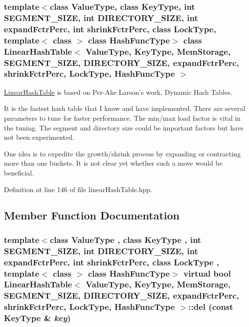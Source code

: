 \subsubsection*{template$<$class ValueType, class KeyType, int SEGMENT\_\-SIZE, int DIRECTORY\_\-SIZE, int expandFctrPerc, int shrinkFctrPerc, class LockType, template$<$ class $>$ class HashFuncType$>$ class LinearHashTable$<$ ValueType, KeyType, MemStorage, SEGMENT\_\-SIZE, DIRECTORY\_\-SIZE, expandFctrPerc, shrinkFctrPerc, LockType, HashFuncType $>$}

\hyperlink{classLinearHashTable}{LinearHashTable} is based on Per-Ake Larson's work, Dynamic Hash Tables. 

It is the fastest hash table that I know and have implemented. There are several parameters to tune for faster performance. The min/max load factor is vital in the tuning. The segment and directory size could be important factors but have not been experimented.

One idea is to expedite the growth/shrink process by expanding or contracting more than one buckets. It is not clear yet whether such a move would be beneficial. 

Definition at line 146 of file linearHashTable.hpp.

\subsection{Member Function Documentation}
\hypertarget{classLinearHashTable_3_01ValueType_00_01KeyType_00_01MemStorage_00_01SEGMENT__SIZE_00_01DIRECTORc7a065a47b9854d6d22bcaeeb634c1b3_acf84eff8af95d7e8b7023f756dd7c01}{
\subsubsection[{del}]{\setlength{\rightskip}{0pt plus 5cm}template$<$class ValueType , class KeyType , int SEGMENT\_\-SIZE, int DIRECTORY\_\-SIZE, int expandFctrPerc, int shrinkFctrPerc, class LockType , template$<$ class $>$ class HashFuncType$>$ virtual bool {\bf LinearHashTable}$<$ ValueType, KeyType, MemStorage, SEGMENT\_\-SIZE, DIRECTORY\_\-SIZE, expandFctrPerc, shrinkFctrPerc, LockType, HashFuncType $>$::del (const KeyType \& {\em key})}}
\label{classLinearHashTable_3_01ValueType_00_01KeyType_00_01MemStorage_00_01SEGMENT__SIZE_00_01DIRECTORc7a065a47b9854d6d22bcaeeb634c1b3_acf84eff8af95d7e8b7023f756dd7c01}


